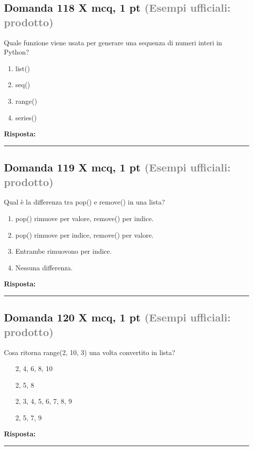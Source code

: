 \documentclass[a4paper,11pt]{article}
\begin{document}
\subsection*{Domanda 118 X \hfill {\small mcq, 1 pt \textcolor{gray}{(Esempi ufficiali: prodotto)}}}
Quale funzione viene usata per generare una sequenza di numeri interi in Python?

\begin{enumerate}[label=\alph*)]
\item list()
\item seq()
\item range()
\item series()
\end{enumerate}
\vspace{0.2cm}
\noindent\textbf{Risposta:}\par
\vspace{1.5cm}\hrule


\subsection*{Domanda 119 X \hfill {\small mcq, 1 pt \textcolor{gray}{(Esempi ufficiali: prodotto)}}}
Qual è la differenza tra pop() e remove() in una lista?

\begin{enumerate}[label=\alph*)]
\item pop() rimuove per valore, remove() per indice.
\item pop() rimuove per indice, remove() per valore.
\item Entrambe rimuovono per indice.
\item Nessuna differenza.
\end{enumerate}
\vspace{0.2cm}
\noindent\textbf{Risposta:}\par
\vspace{1.5cm}\hrule


\subsection*{Domanda 120 X \hfill {\small mcq, 1 pt \textcolor{gray}{(Esempi ufficiali: prodotto)}}}
Cosa ritorna range(2, 10, 3) una volta convertito in lista?

\begin{enumerate}[label=\alph*)]
\item [2, 4, 6, 8, 10]
\item [2, 5, 8]
\item [2, 3, 4, 5, 6, 7, 8, 9]
\item [2, 5, 7, 9]
\end{enumerate}
\vspace{0.2cm}
\noindent\textbf{Risposta:}\par
\vspace{1.5cm}\hrule
\end{document}

